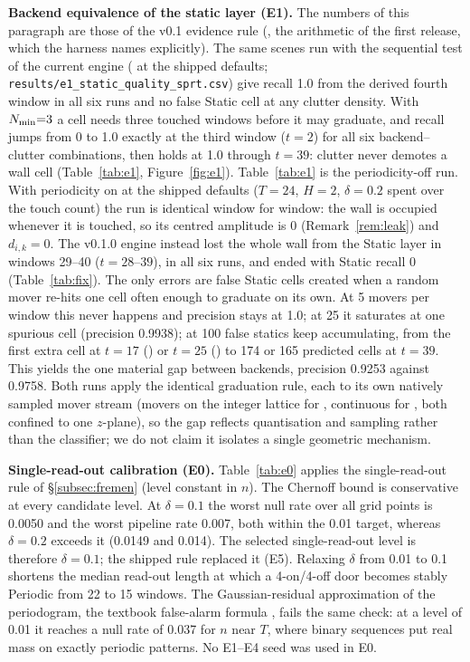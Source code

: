 


\noindent\textbf{Backend equivalence of the static layer (E1).} The numbers of this paragraph are those of the v0.1 evidence rule (, the arithmetic of the first release, which the harness names explicitly). The same scenes run with the sequential test of the current engine ( at the shipped defaults; \nolinkurl{results/e1_static_quality_sprt.csv}) give recall 1.0 from the derived fourth window in all six runs and no false Static cell at any clutter density. With $N_{\min}{=}3$ a cell needs three touched windows before it may graduate, and recall jumps from 0 to 1.0 exactly at the third window ($t{=}2$) for all six backend--clutter combinations, then holds at 1.0 through $t{=}39$: clutter never demotes a wall cell (Table~\ref{tab:e1}, Figure~\ref{fig:e1}). Table~\ref{tab:e1} is the periodicity-off run. With periodicity on at the shipped defaults ($T{=}24$, $H{=}2$, $\delta{=}0.2$ spent over the touch count) the run is identical window for window: the wall is occupied whenever it is touched, so its centred amplitude is 0 (Remark~\ref{rem:leak}) and $d_{i,k}=0$. The v0.1.0 engine instead lost the whole wall from the Static layer in windows 29--40 ($t=28$--$39$), in all six runs, and ended with Static recall 0 (Table~\ref{tab:fix}). The only errors are false Static cells created when a random mover re-hits one cell often enough to graduate on its own. At 5 movers per window this never happens and precision stays at 1.0; at 25 it saturates at one spurious cell (precision 0.9938); at 100 false statics keep accumulating, from the first extra cell at $t{=}17$ () or $t{=}25$ () to 174 or 165 predicted cells at $t{=}39$. This yields the one material gap between backends, precision 0.9253 against 0.9758. Both runs apply the identical graduation rule, each to its own natively sampled mover stream (movers on the integer lattice for , continuous for , both confined to one $z$-plane), so the gap reflects quantisation and sampling rather than the classifier; we do not claim it isolates a single geometric mechanism.






\noindent\textbf{Single-read-out calibration (E0).} Table~\ref{tab:e0} applies the single-read-out rule of \S\ref{subsec:fremen} (level constant in $n$). The Chernoff bound is conservative at every candidate level. At $\delta{=}0.1$ the worst null rate over all grid points is 0.0050 and the worst pipeline rate 0.007, both within the 0.01 target, whereas $\delta{=}0.2$ exceeds it (0.0149 and 0.014). The selected single-read-out level is therefore $\delta{=}0.1$; the shipped rule replaced it (E5). Relaxing $\delta$ from 0.01 to 0.1 shortens the median read-out length at which a 4-on/4-off door becomes stably Periodic from 22 to 15 windows. The Gaussian-residual approximation of the periodogram, the textbook false-alarm formula \citep{zechmeister2009gls}, fails the same check: at a level of 0.01 it reaches a null rate of 0.037 for $n$ near $T$, where binary sequences put real mass on exactly periodic patterns. No E1--E4 seed was used in E0.

